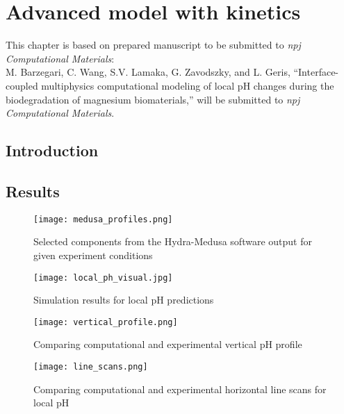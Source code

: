 \chapter{Advanced model with kinetics}\label{ch:kinetics}


\begin{shaded}
This chapter is based on prepared manuscript to be submitted to  \textit{npj Computational Materials}:\\
M. Barzegari, C. Wang, S.V. Lamaka, G. Zavodszky, and L. Geris, ``Interface-coupled multiphysics computational modeling of local pH changes during the biodegradation of magnesium biomaterials,'' will be submitted to \textit{npj Computational Materials}.
\end{shaded}

\section{Introduction}


\section{Results}

\begin{figure}[h]
\centering
\medskip
\texttt{[image: medusa\_profiles.png]}
\caption[Hydra-Medusa software output for given experiment conditions]{Selected components from the Hydra-Medusa software output for given experiment conditions} \label{fig:kinetics_medusa_profiles}
\end{figure}

\begin{figure}[h]
\centering
\medskip
\texttt{[image: local\_ph\_visual.jpg]}
\caption[Simulation results for local pH predictions]{Simulation results for local pH predictions} \label{fig:kinetics_local_ph_visual}
\end{figure}

\begin{figure}[h]
\centering
\medskip
\texttt{[image: vertical\_profile.png]}
\caption[Comparing computational and experimental vertical pH profile]{Comparing computational and experimental vertical pH profile} \label{fig:kinetics_vertical_profile}
\end{figure}

\begin{figure}[h]
\centering
\medskip
\texttt{[image: line\_scans.png]}
\caption[Comparing computational and experimental horizontal line scans for  local pH]{Comparing computational and experimental horizontal line scans for  local pH} \label{fig:kinetics_line_scans}
\end{figure}

